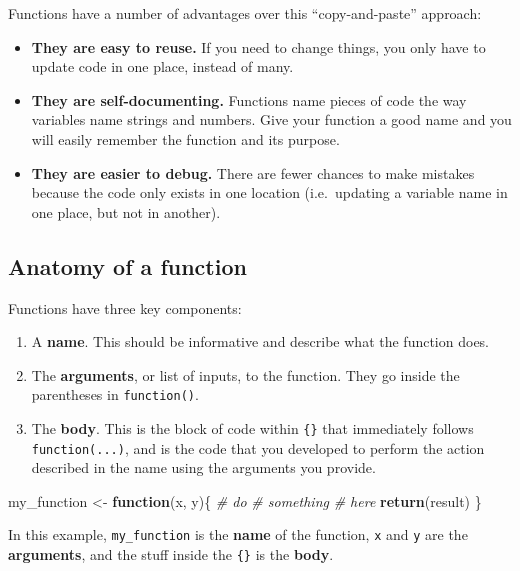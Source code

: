 \documentclass[]{book}
\newenvironment{Shaded}{\begin{snugshade}}{\end{snugshade}}
\newcommand{\KeywordTok}[1]{\textcolor[rgb]{0.13,0.29,0.53}{\textbf{#1}}}
\newcommand{\StringTok}[1]{\textcolor[rgb]{0.31,0.60,0.02}{#1}}
\newcommand{\CommentTok}[1]{\textcolor[rgb]{0.56,0.35,0.01}{\textit{#1}}}
\newcommand{\ControlFlowTok}[1]{\textcolor[rgb]{0.13,0.29,0.53}{\textbf{#1}}}
\newcommand{\NormalTok}[1]{#1}
\providecommand{\tightlist}{%
  \setlength{\itemsep}{0pt}\setlength{\parskip}{0pt}}
\begin{document}
Functions have a number of advantages over this ``copy-and-paste''
approach:

\begin{itemize}
\item
  \textbf{They are easy to reuse.} If you need to change things, you
  only have to update code in one place, instead of many.
\item
  \textbf{They are self-documenting.} Functions name pieces of code the
  way variables name strings and numbers. Give your function a good name
  and you will easily remember the function and its purpose.
\item
  \textbf{They are easier to debug.} There are fewer chances to make
  mistakes because the code only exists in one location (i.e.~updating a
  variable name in one place, but not in another).
\end{itemize}

\subsection{Anatomy of a function}\label{anatomy-of-a-function}

Functions have three key components:

\begin{enumerate}
\def\labelenumi{\arabic{enumi}.}
\tightlist
\item
  A \textbf{name}. This should be informative and describe what the
  function does.
\item
  The \textbf{arguments}, or list of inputs, to the function. They go
  inside the parentheses in \texttt{function()}.
\item
  The \textbf{body}. This is the block of code within \texttt{\{\}} that
  immediately follows \texttt{function(...)}, and is the code that you
  developed to perform the action described in the name using the
  arguments you provide.
\end{enumerate}

\begin{Shaded}
\begin{Highlighting}[]
\NormalTok{my_function <-}\StringTok{ }\ControlFlowTok{function}\NormalTok{(x, y)\{}
  \CommentTok{# do}
  \CommentTok{# something}
  \CommentTok{# here}
  \KeywordTok{return}\NormalTok{(result)}
\NormalTok{\}}
\end{Highlighting}
\end{Shaded}

In this example, \texttt{my\_function} is the \textbf{name} of the
function, \texttt{x} and \texttt{y} are the \textbf{arguments}, and the
stuff inside the \texttt{\{\}} is the \textbf{body}.
\end{document}
